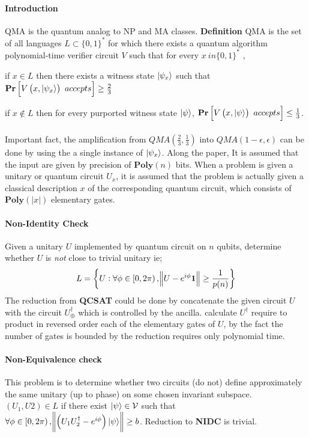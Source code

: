 

\paragraph{Introduction}
QMA is the quantum analog to NP and MA classes.  \textbf{Definition} QMA is the set of all languages \( L \subset \{ 0, 1\}^{*} \) for which there exists a quantum algorithm polynomial-time verifier circuit \( V \) such that for every \( x \ in \{0,1\}^*\) ,

    if \( x \in L \) then there exists a witness state \( \ket{\psi_x} \) such that \( \mathbf{Pr} \left[ { V \left(x, \ket{\psi_x} \right) \ accepts } \right] \ge \frac{2}{3} \) 
    
    if \( x \not\in L \) then for every purported witness state \( \ket{\psi} \), \( \mathbf{Pr} \left[ { V \left(x, \ket{\psi} \right) \ accepts } \right] \le \frac{1}{3} \).
\paragraph{}Important fact, the amplification from \( QMA \left( \frac{2}{3}, \frac{1}{3} \right) \) into  \( QMA \left( 1-\epsilon, \epsilon \right) \) can be done by using the a single instance of \( \ket{ \psi_x } \). Along the paper,  It is assumed that the input are given by precision of \( \mathbf{ Poly} (n) \) bits. When a problem is given a unitary or quantum circuit \( U_x \), it is assumed that the problem is actually given  a classical description \(x\) of the corresponding quantum circuit, which consists of \( \mathbf{Poly} (|x|) \) elementary gates.

\paragraph{Non-Identity Check} Given a unitary \( U \) implemented by quantum circuit on  \( n\) qubits, determine whether \( U \) is \textit{not} close to trivial unitary ie; \[ L = \left\{ U : \forall \phi \in \left[0, 2\pi\right), \norm{U-e^{i\phi} \mathbf{1} } \ge \frac{1}{p(n)} \right\} \] 
The reduction from \textbf{QCSAT} could be done by concatenate the given circuit \( U \) with the circuit \( U_{\oplus}^{\dagger} \) which is controlled by the ancilla. calculate \( U^{\dagger} \) require to product in reversed order each of the elementary gates of \(U\), by the fact the number of gates is bounded by  the reduction requires only polynomial time.   

\paragraph{Non-Equivalence check} This problem is to determine whether two circuits (do not) define approximately the same unitary (up to phase) on some chosen invariant subspace.  \( \left(U_1,U2\right) \in L \) if there exist \( \ket{\psi} \in \mathcal{V} \) such that \( \forall \phi \in \left[0, 2\pi \right), \norm{\left( U_1U_{2}^{\dagger} - e^{i\phi}\right)\ket{\psi}}\ge b \).
Reduction to \textbf{NIDC} is trivial.

